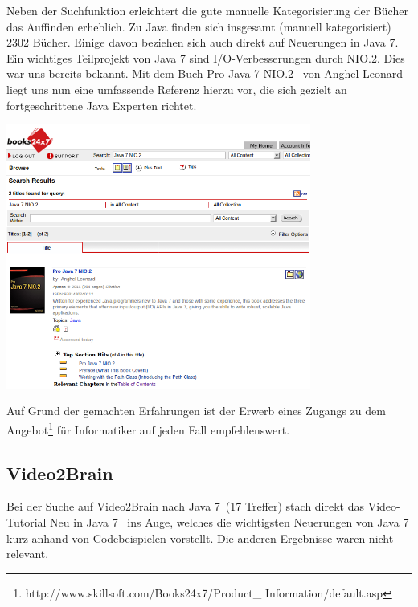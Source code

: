 Neben der Suchfunktion erleichtert die gute manuelle Kategorisierung der Bücher das Auffinden erheblich. Zu Java finden sich insgesamt (manuell kategorisiert) 2302 Bücher. Einige davon beziehen sich auch direkt auf Neuerungen in Java 7.\\

Ein wichtiges Teilprojekt von Java 7 sind I/O-Verbesserungen durch NIO.2. Dies war uns bereits bekannt. Mit dem Buch \glqq Pro Java 7 NIO.2\grqq\cite{b247nio2} ~von Anghel Leonard liegt uns nun eine umfassende Referenz hierzu vor, die sich gezielt an fortgeschrittene Java Experten richtet.

\begin{center}
\includegraphics[width=10cm]{images/books247.png}
\end{center}

Auf Grund der gemachten Erfahrungen ist der Erwerb eines Zugangs zu dem Angebot\footnote{http://www.skillsoft.com/Books24x7/Product\_ Information/default.asp} für Informatiker auf jeden Fall empfehlenswert.

\subsection*{Video2Brain}
Bei der Suche auf Video2Brain nach \glqq Java 7\grqq~(17 Treffer) stach direkt das Video-Tutorial \glqq Neu in Java 7\grqq\cite{v2bJava7}~
ins Auge, welches die wichtigsten Neuerungen von Java 7 kurz anhand von Codebeispielen vorstellt.
Die anderen Ergebnisse waren nicht relevant.
%





